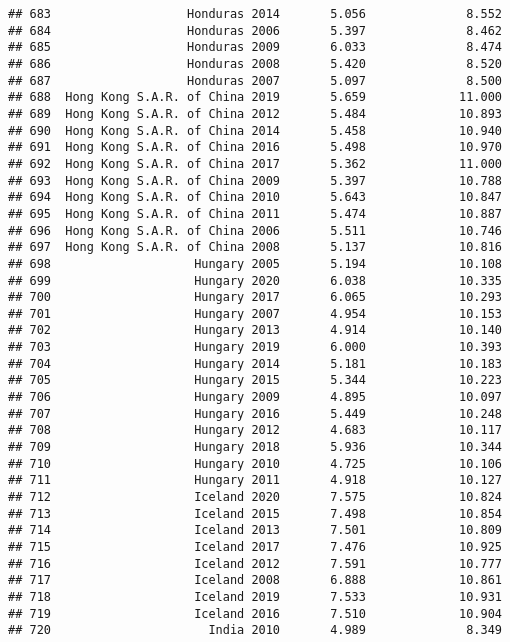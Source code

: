 \documentclass[
]{article}
\begin{document}
\begin{verbatim}
## 683                   Honduras 2014       5.056              8.552
## 684                   Honduras 2006       5.397              8.462
## 685                   Honduras 2009       6.033              8.474
## 686                   Honduras 2008       5.420              8.520
## 687                   Honduras 2007       5.097              8.500
## 688  Hong Kong S.A.R. of China 2019       5.659             11.000
## 689  Hong Kong S.A.R. of China 2012       5.484             10.893
## 690  Hong Kong S.A.R. of China 2014       5.458             10.940
## 691  Hong Kong S.A.R. of China 2016       5.498             10.970
## 692  Hong Kong S.A.R. of China 2017       5.362             11.000
## 693  Hong Kong S.A.R. of China 2009       5.397             10.788
## 694  Hong Kong S.A.R. of China 2010       5.643             10.847
## 695  Hong Kong S.A.R. of China 2011       5.474             10.887
## 696  Hong Kong S.A.R. of China 2006       5.511             10.746
## 697  Hong Kong S.A.R. of China 2008       5.137             10.816
## 698                    Hungary 2005       5.194             10.108
## 699                    Hungary 2020       6.038             10.335
## 700                    Hungary 2017       6.065             10.293
## 701                    Hungary 2007       4.954             10.153
## 702                    Hungary 2013       4.914             10.140
## 703                    Hungary 2019       6.000             10.393
## 704                    Hungary 2014       5.181             10.183
## 705                    Hungary 2015       5.344             10.223
## 706                    Hungary 2009       4.895             10.097
## 707                    Hungary 2016       5.449             10.248
## 708                    Hungary 2012       4.683             10.117
## 709                    Hungary 2018       5.936             10.344
## 710                    Hungary 2010       4.725             10.106
## 711                    Hungary 2011       4.918             10.127
## 712                    Iceland 2020       7.575             10.824
## 713                    Iceland 2015       7.498             10.854
## 714                    Iceland 2013       7.501             10.809
## 715                    Iceland 2017       7.476             10.925
## 716                    Iceland 2012       7.591             10.777
## 717                    Iceland 2008       6.888             10.861
## 718                    Iceland 2019       7.533             10.931
## 719                    Iceland 2016       7.510             10.904
## 720                      India 2010       4.989              8.349

\end{verbatim}
\end{document}
